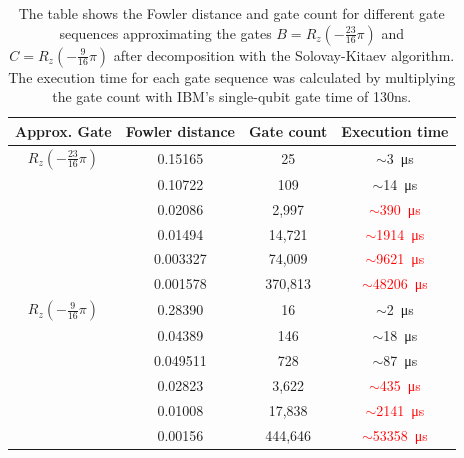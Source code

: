 \begin{table}[H]
\centering
    \begin{tabular}{c| c |c |c }
      \toprule
      Approx. Gate & Fowler distance & Gate count & Execution time\\
      \midrule
      $R_z(-\frac{23}{16}\pi)$ & 0.15165 & 25 & \textcolor{emerald}{$\sim$\SI{3}{\micro\second}}\\
       & 0.10722 & 109 & \textcolor{emerald}{$\sim$\SI{14}{\micro\second}}\\
       & 0.02086 & 2,997 & \textcolor{red}{$\sim$\SI{390}{\micro\second}}\\
       & 0.01494 & 14,721 & \textcolor{red}{$\sim$\SI{1914}{\micro\second}}\\
       & 0.003327 & 74,009 & \textcolor{red}{$\sim$\SI{9621}{\micro\second}}\\
       & 0.001578 & 370,813 & \textcolor{red}{$\sim$\SI{48206}{\micro\second}}\\
       \midrule
      $R_z(-\frac{9}{16}\pi)$ & 0.28390 & 16 & \textcolor{emerald}{$\sim$\SI{2}{\micro\second}}\\
       & 0.04389 & 146 & \textcolor{emerald}{$\sim$\SI{18}{\micro\second}}\\
       & 0.049511 & 728 & \textcolor{emerald}{$\sim$\SI{87}{\micro\second}}\\
       & 0.02823 & 3,622 & \textcolor{red}{$\sim$\SI{435}{\micro\second}}\\
       & 0.01008 & 17,838 & \textcolor{red}{$\sim$\SI{2141}{\micro\second}}\\
       & 0.00156 & 444,646 & \textcolor{red}{$\sim$\SI{53358}{\micro\second}}\\
      \bottomrule
      \bottomrule
    \end{tabular}
    \caption{\label{tab:sktimes} The table shows the Fowler distance and gate count for different gate sequences approximating the gates $B = R_z(-\frac{23}{16}\pi)$ and $C = R_z(-\frac{9}{16}\pi)$ after decomposition with the Solovay-Kitaev algorithm. The execution time for each gate sequence was calculated by multiplying the gate count with IBM's single-qubit gate time of 130ns.}
  \end{table}

